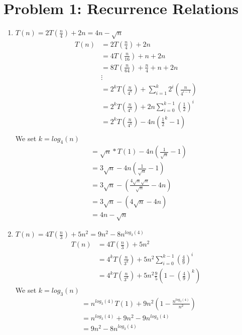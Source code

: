 \documentclass[12pt]{article}
\begin{document}
\section*{Problem 1: Recurrence Relations}
\begin{enumerate}
\item[(a)] $T(n) = 2T(\frac{n}{4}) + 2n = 4n - \sqrt{n}$
\begin{align*}
  T(n) &= 2T(\frac{n}{4}) + 2n \\
  &= 4T(\frac{n}{16}) + n + 2n \\
  &= 8T(\frac{n}{64}) + \frac{n}{4} + n + 2n \\
  &\vdots \\
  &= 2^kT(\frac{n}{4^k}) + \sum_{i=1}^{k}2^i(\frac{n}{4^{i-1}}) \\
  &= 2^kT(\frac{n}{4^k}) + 2n\sum_{i=0}^{k-1}(\frac{1}{2})^i \\
  &= 2^kT(\frac{n}{4^k}) - 4n(\frac{1}{2}^{k} - 1) \\
\end{align*}
We set $k = log_4(n)$
\begin{align*}
  &= \sqrt{n} * T(1) - 4n(\frac{1}{\sqrt{n}} - 1) \\
  &= 3\sqrt{n} - 4n(\frac{1}{\sqrt{n}} - 1) \\
  &= 3\sqrt{n} - (\frac{4\sqrt{n}\sqrt{n}}{\sqrt{n}} - 4n) \\
  &= 3\sqrt{n} - (4 \sqrt{n} - 4n)\\
  &= 4n - \sqrt{n}
\end{align*}

\item[(b)] $T(n) = 4T(\frac{n}{3}) + 5n^2 = 9n^2 - 8n^{log_3(4)}$
\begin{align*}
  T(n) &= 4T(\frac{n}{3}) + 5n^2 \\
  &= 4^kT(\frac{n}{3^k}) + 5n^2\sum_{i=0}^{k-1}(\frac{4}{9})^i \\
  &= 4^kT(\frac{n}{3^k}) + 5n^2\frac{9}{5}(1-(\frac{4}{9})^k)
\end{align*}
We set $k = log_3(n)$
\begin{align*}
  &= n^{log_3(4)} T(1) + 9n^2(1-\frac{n^{log_3(4)}}{n^2}) \\
  &= n^{log_3(4)} + 9n^2 - 9n^{log_3(4)}\\
  &= 9n^2 - 8n^{log_3(4)}\\
\end{align*}



\end{enumerate}
\end{document}
